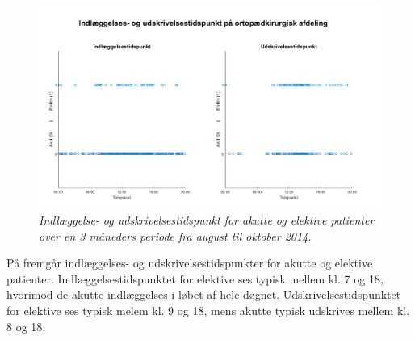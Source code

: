 \begin{figure}[H]
	\centering
	\includegraphics[scale=0.5]{figures/indlaegudskriv.png}
	\caption{\textit{Indlæggelse- og udskrivelsestidspunkt for akutte og elektive patienter over en 3 måneders periode fra august til oktober 2014.}}
	\label{indlaegudskriv}
	\end{figure}
	
\noindent
På  fremgår indlæggelses- og udskrivelsestidspunkter for akutte og elektive patienter. Indlæggelsestidspunktet for elektive ses typisk mellem kl. 7 og 18, hvorimod de akutte indlæggelses i løbet af hele døgnet. Udskrivelsestidspunktet for elektive ses typisk melem kl. 9 og 18, mens akutte typisk udskrives mellem kl. 8 og 18. 